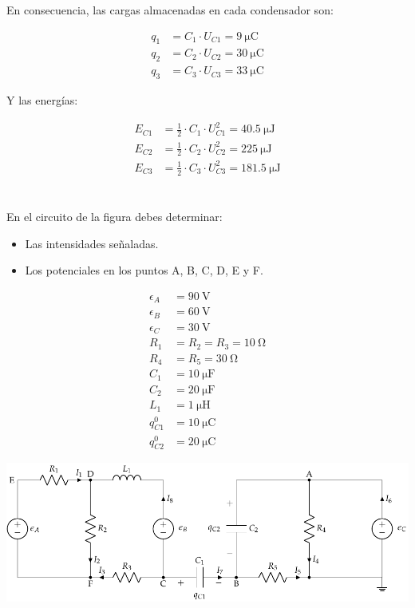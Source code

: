 \documentclass[10pt]{article}
\begin{document}
En consecuencia, las cargas almacenadas en cada condensador son:

\begin{align*}
  q_1 &= C_1 \cdot U_{C1} = \SI{9}{\micro\coulomb}\\
  q_2 &= C_2 \cdot U_{C2} = \SI{30}{\micro\coulomb}\\
  q_3 &= C_3 \cdot U_{C3} = \SI{33}{\micro\coulomb}
\end{align*}

Y las energías:

\begin{align*}
  E_{C1} &= \frac{1}{2} \cdot C_1 \cdot U^2_{C1} = \SI{40.5}{\micro\joule}\\
  E_{C2} &= \frac{1}{2} \cdot C_2 \cdot U^2_{C2} = \SI{225}{\micro\joule}\\
  E_{C3} &= \frac{1}{2} \cdot C_3 \cdot U^2_{C3} = \SI{181.5}{\micro\joule}
\end{align*}


\clearpage

\section{}

En el circuito de la figura debes determinar:
\begin{itemize}
\item Las intensidades señaladas.
\item Los potenciales en los puntos A, B, C, D, E y F.
\end{itemize}


\begin{minipage}[c]{0.2\linewidth}
  \begin{align*}
    \epsilon_{A}&=\SI{90}{\volt}\\
    \epsilon_{B}&=\SI{60}{\volt}\\
    \epsilon_{C}&=\SI{30}{\volt}\\
    R_{1}&= R_2 = R_3 = \SI{10}{\ohm}\\
    R_{4}&= R_5 = \SI{30}{\ohm}\\
    C_{1}&= \SI{10}{\micro\farad}\\
    C_{2}&= \SI{20}{\micro\farad}\\
    L_1 &= \SI{1}{\micro\henry}\\
    q^0_{C1} &= \SI{10}{\micro\coulomb}\\
    q^0_{C2} &= \SI{20}{\micro\coulomb}
  \end{align*}
\end{minipage}
\begin{minipage}[c]{0.8\linewidth}
  \includegraphics[scale = 0.8]{figs/mallas_carga_inicial.pdf}
\end{minipage}
\end{document}
